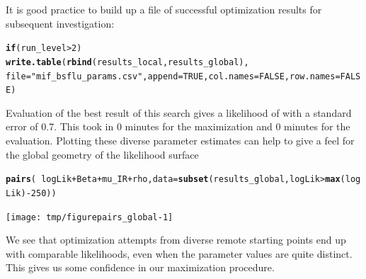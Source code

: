 \documentclass{beamer}\usepackage[]{graphicx}\usepackage[]{color}
\makeatletter
\newcommand{\hlnum}[1]{\textcolor[rgb]{0.686,0.059,0.569}{#1}}%
\newcommand{\hlstr}[1]{\textcolor[rgb]{0.192,0.494,0.8}{#1}}%
\newcommand{\hlopt}[1]{\textcolor[rgb]{0,0,0}{#1}}%
\newcommand{\hlstd}[1]{\textcolor[rgb]{0.345,0.345,0.345}{#1}}%
\newcommand{\hlkwa}[1]{\textcolor[rgb]{0.161,0.373,0.58}{\textbf{#1}}}%
\newcommand{\hlkwc}[1]{\textcolor[rgb]{0.333,0.667,0.333}{#1}}%
\newcommand{\hlkwd}[1]{\textcolor[rgb]{0.737,0.353,0.396}{\textbf{#1}}}%
\newenvironment{kframe}{%
 \def\at@end@of@kframe{}%
 \ifinner\ifhmode%
  \def\at@end@of@kframe{\end{minipage}}%
  \begin{minipage}{\columnwidth}%
 \fi\fi%
 \def\FrameCommand##1{\hskip\@totalleftmargin \hskip-\fboxsep
 \colorbox{shadecolor}{##1}\hskip-\fboxsep
     \hskip-\linewidth \hskip-\@totalleftmargin \hskip\columnwidth}%
 \MakeFramed {\advance\hsize-\width
   \@totalleftmargin\z@ \linewidth\hsize
   \@setminipage}}%
 {\par\unskip\endMakeFramed%
 \at@end@of@kframe}
\newenvironment{knitrout}{}{} %
\makeatother
\begin{document}
\begin{frame}[fragile]
\bi
\item  It is good practice to build up a file of successful optimization results for subsequent investigation:
\ei

\begin{knitrout}\small
{}\color{fgcolor}\begin{kframe}
\begin{alltt}
\hlkwa{if} \hlstd{(run_level}\hlopt{>}\hlnum{2}\hlstd{)}
  \hlkwd{write.table}\hlstd{(}\hlkwd{rbind}\hlstd{(results_local,results_global),}
              \hlkwc{file}\hlstd{=}\hlstr{"mif_bsflu_params.csv"}\hlstd{,}\hlkwc{append}\hlstd{=}\hlnum{TRUE}\hlstd{,}\hlkwc{col.names}\hlstd{=}\hlnum{FALSE}\hlstd{,}\hlkwc{row.names}\hlstd{=}\hlnum{FALSE}\hlstd{)}
\end{alltt}
\end{kframe}
\end{knitrout}

\bi

\item  Evaluation of the best result of this search gives a likelihood of  with a standard error of 0.7. This took in 0 minutes for the maximization and 0 minutes for the evaluation.  Plotting these diverse parameter estimates can help to give a feel for the global geometry of the likelihood surface 

\ei

\begin{knitrout}\small
{}\color{fgcolor}\begin{kframe}
\begin{alltt}
\hlkwd{pairs}\hlstd{(}\hlopt{~}\hlstd{logLik}\hlopt{+}\hlstd{Beta}\hlopt{+}\hlstd{mu_IR}\hlopt{+}\hlstd{rho,}\hlkwc{data}\hlstd{=}\hlkwd{subset}\hlstd{(results_global,logLik}\hlopt{>}\hlkwd{max}\hlstd{(logLik)}\hlopt{-}\hlnum{250}\hlstd{))}
\end{alltt}
\end{kframe}

{\centering \texttt{[image: tmp/figurepairs\_global-1]} 

}



\end{knitrout}

\bi

\item  We see that optimization attempts from diverse remote starting points end up with comparable likelihoods, even when the parameter values are quite distinct. This gives us some confidence in our maximization procedure. 
\ei

\end{frame}   
\end{document}
